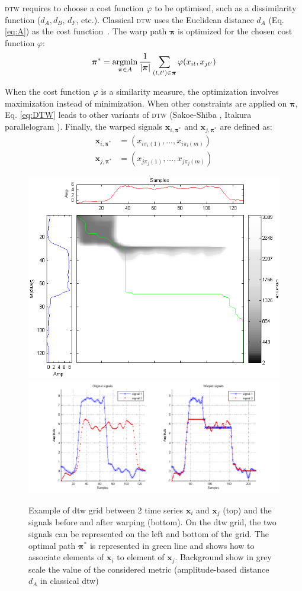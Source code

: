 \textsc{dtw} requires to choose a cost function $\varphi$ to be optimised, such as a dissimilarity function ($d_A, d_B$, $d_F$, etc.). Classical \textsc{dtw} uses the Euclidean distance $d_A$ (Eq. \ref{eq:A}) as the cost function~\cite{Berndt1994a}. The warp path $\boldsymbol{\pi}$ is optimized for the chosen cost function $\varphi$:
\begin{equation}
\boldsymbol{\pi}^* = \argmin_{\boldsymbol{\pi} \in A} \frac{1}{|\boldsymbol{\pi}|}
\sum_{(t,t') \in \boldsymbol{\pi}} \varphi(x_{it}, x_{jt'})
\label{eq:DTW}
\end{equation}

\noindent When the cost function $\varphi$ is a similarity measure, the optimization involves maximization instead of minimization. When other constraints are applied on $\boldsymbol{\pi}$, Eq. \eqref{eq:DTW} leads to other variants of \textsc{dtw} (Sakoe-Shiba \cite{Sakoe1978a}, Itakura parallelogram \cite{Rabiner1993}). Finally, the warped signals $\textbf{x}_{i,\boldsymbol{\pi}^*}$ and $\textbf{x}_{j,\boldsymbol{\pi}^*}$ are defined as:
\begin{align}
\textbf{x}_{i,\boldsymbol{\pi}^*} 
&= (x_{i\pi_i(1)}, ..., 
x_{i\pi_i(m)}) 			\\	
\textbf{x}_{j,\boldsymbol{\pi}^*} 
&= (x_{j\pi_j(1)}, ..., 
x_{j\pi_j(m)}) 	
\end{align}

\begin{figure}[h!]
	\centering
	\includegraphics[width=0.5\linewidth]{images/DTWgrid2}
	\includegraphics[width=0.9\linewidth]{images/DTWwarpedSignals}
	\caption{Example of {\sc dtw} grid between 2 time series $\textbf{x}_{i}$ and $\textbf{x}_{j}$ (top) and the signals before and after warping (bottom). On the {\sc dtw} grid, the two signals can be represented on the left and bottom of the grid. The optimal path $\boldsymbol{\pi}^*$ is represented in green line and shows how to associate elements of $\textbf{x}_{i}$ to element of $\textbf{x}_{j}$. Background show in grey scale the value of the considered metric (amplitude-based distance $d_A$ in classical {\sc dtw})}
	\label{fig:DTWgrid}
\end{figure}


